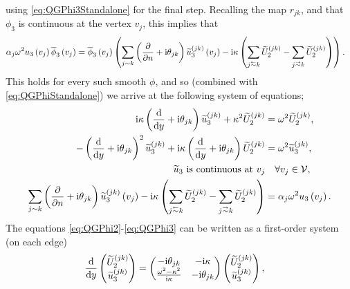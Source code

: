 using \eqref{eq:QGPhi3Standalone} for the final step.
Recalling the map $r_{jk}$, and that $\phi_3$ is continuous at the vertex $v_j$, this implies that 
\begin{align*}
	\alpha_j \omega^2 u_3\bracs{v_j} \overline{\phi}_3\bracs{v_j} 
	&= \overline{\phi}_3\bracs{v_j} \bracs{ \sum_{j\con k} \bracs{ \pdiff{}{n} + \rmi\qm_{jk} }\widetilde{u}_3^{(jk)}\bracs{v_j} - \rmi\wavenumber\bracs{ \sum_{j\conRight k} \widetilde{U}_2^{(jk)} - \sum_{j\conLeft k} \widetilde{U}_2^{(jk)} } }. %
\end{align*}
This holds for every such smooth $\phi$, and so (combined with \eqref{eq:QGPhiStandalone}) we arrive at the following system of equations;
\begin{subequations} \label{eq:QGRawSystem}
	\begin{align}
		\rmi\wavenumber \bracs{ \diff{}{y} + \rmi\qm_{jk} }\widetilde{u}_3^{(jk)} + \wavenumber^2\widetilde{U}_2^{(jk)} &= \omega^2\widetilde{U}_2^{(jk)}, \label{eq:QGPhi2} \\
		-\bracs{ \diff{}{y} + \rmi\qm_{jk} }^2\widetilde{u}_3^{(jk)} + \rmi\wavenumber\bracs{ \diff{}{y} + \rmi\qm_{jk} }\widetilde{U}_2^{(jk)} &= \omega^2 \widetilde{u}_3^{(jk)}, \label{eq:QGPhi3} \\
		\widetilde{u}_3 \text{ is continuous at } v_j &\quad\forall v_j\in\vertSet, \label{eq:QGContinuity} \\
		\sum_{j\con k} \bracs{ \pdiff{}{n} + \rmi\qm_{jk} }\widetilde{u}_3^{(jk)}\bracs{v_j} - \rmi\wavenumber\bracs{ \sum_{j\conRight k} \widetilde{U}_2^{(jk)} - \sum_{j\conLeft k} \widetilde{U}_2^{(jk)} } 
		&= \alpha_j \omega^2 u_3\bracs{v_j}. \label{eq:QGVertexCondition}
	\end{align}
\end{subequations}
The equations \eqref{eq:QGPhi2}-\eqref{eq:QGPhi3} can be written as a first-order system (on each edge)
\begin{align*}
	\dfrac{\mathrm{d}}{\mathrm{d}y} \begin{pmatrix} \widetilde{U}_2^{(jk)} \\ \widetilde{u}_3^{(jk)} \end{pmatrix}
	&= 
	\begin{pmatrix} 
		-\mathrm{i}\theta_{jk} & -\mathrm{i}\kappa \\	
		\frac{\omega^2-\kappa^2}{\mathrm{i}\kappa} & -\mathrm{i}\theta_{jk}
	\end{pmatrix}
	\begin{pmatrix} \widetilde{U}_2^{(jk)} \\ \widetilde{u}_3^{(jk)} \end{pmatrix},
\end{align*}
